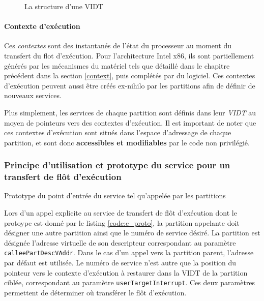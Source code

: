 \begin{figure}[!ht]
	\centering
	
	\caption{La structure d'une VIDT}
	\label{fig:vidt}
\end{figure}

	\paragraph{Contexte d'exécution} Ces \emph{contextes} sont des instantanés de l'état du processeur au moment du transfert du flot d'exécution. Pour l'architecture Intel x86, ils sont partiellement générés par les mécanismes du matériel tels que détaillé dans le chapitre précédent dans la section \ref{context}, puis complétés par du logiciel. Ces contextes d'exécution peuvent aussi être créés ex-nihilo par les partitions afin de définir de nouveaux services.


Plus simplement, les services de chaque partition sont définis dans leur \emph{VIDT} au moyen de pointeurs vers des contextes d'exécution. Il est important de noter que ces contextes d'exécution sont situés dans l'espace d'adressage de chaque partition, et sont donc \textbf{accessibles et modifiables} par le code non privilégié.

	\subsubsection{Principe d'utilisation et prototype du service pour un transfert de flôt d'exécution}
	\label{sec:service_usage}
	\begin{listing}[!ht]
		\caption{Prototype du point d'entrée du service tel qu'appelée par les partitions}
		\label{code:c_proto}
	\end{listing}

	Lors d'un appel explicite au service de transfert de flôt d'exécution dont le protoype est donné par le listing \ref{code:c_proto}, la partition appelante doit désigner une autre partition ainsi que le numéro de service désiré. La partition est désignée l'adresse virtuelle de son descripteur correspondant au paramètre \texttt{calleePartDescVAddr}. Dans le cas d'un appel vers la partition parent, l'adresse par défaut est utilisée. Le numéro de service n'est autre que la position du pointeur vers le contexte d'exécution à restaurer dans la VIDT de la partition ciblée, correspondant au paramètre \texttt{userTargetInterrupt}. Ces deux paramètres permettent de déterminer où transférer le flôt d'exécution.

